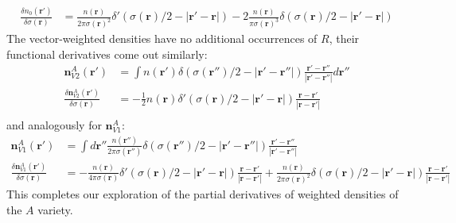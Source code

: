\documentclass[letterpaper,twocolumn,amsmath,amssymb,jcp,10pt,aip]{revtex4-1}
\newcommand{\rr}{\textbf{r}}
\begin{document}
\begin{widetext}
\begin{align}
  \frac{\delta n_0(\rr')}{\delta \sigma(\rr)}
  &= \frac{n(\rr)}{2\pi
    \sigma(\rr)^2}\delta'(\sigma(\rr)/2 -\left|\rr' - \rr\right|)
  -
  2 \frac{n(\rr)}{\pi
    \sigma(\rr)^3}\delta(\sigma(\rr)/2 -\left|\rr' - \rr\right|)
\end{align}
The vector-weighted densities have no additional occurrences of $R$,
their functional derivatives come out similarly:
\begin{align}
  \mathbf{n}_{V2}^{A}(\rr') &= \int n(\rr') \delta(\sigma(\rr'')/2 -\left|\rr' - \rr''\right|)
    \frac{\rr'-\rr''}{|\rr'-\rr''|} d \rr''\\
  \frac{\delta \mathbf{n}_{V2}^{A}(\rr')}{\delta \sigma(\rr)} &= -\frac 12 n(\rr) \delta'(\sigma(\rr)/2 -\left|\rr' - \rr\right|)
    \frac{\rr-\rr'}{|\rr-\rr'|}\\
\end{align}
and analogously for $\mathbf{n}_{V1}^A$:
\begin{align}
  \mathbf{n}_{V1}^A(\rr') &= \int d\rr'' \frac{n(\rr'')}{2\pi \sigma(\rr'')}
  \delta(\sigma(\rr'')/2 -\left|\rr' - \rr''\right|) \frac{\rr'-\rr''}{|\rr'-\rr''|}\\
  \frac{\delta \mathbf{n}_{V1}^A(\rr')}{\delta \sigma(\rr)}
  &= -\frac{n(\rr)}{4\pi
    \sigma(\rr)}\delta'(\sigma(\rr)/2 -\left|\rr' - \rr\right|) \frac{\rr-\rr'}{|\rr-\rr'|}
  +
  \frac{n(\rr)}{2\pi
    \sigma(\rr)^2}\delta(\sigma(\rr)/2 -\left|\rr' - \rr\right|) \frac{\rr-\rr'}{|\rr-\rr'|}
\end{align}
This completes our exploration of the partial derivatives of weighted
densities of the $A$ variety.

\end{widetext}
\end{document}
